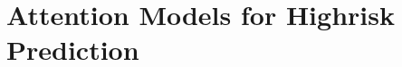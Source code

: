 \documentclass{article}
\begin{document}







\section{Attention Models for Highrisk Prediction}
\label{Models}
\end{document}
